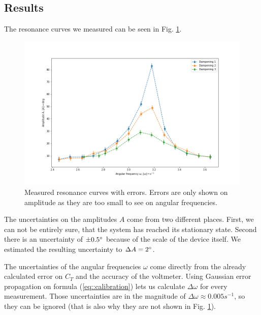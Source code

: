 \subsection{Results}
The resonance curves we measured can be seen in Fig. \ref{fig::resonance}.

\begin{figure} [ht]
	\centering
	\includegraphics[width=350pt]{python/resonance.PNG}
	\caption{Measured resonance curves with errors. Errors are only shown on amplitude as they are too small to see on angular frequencies.}
	\label{fig::resonance}
\end{figure}

The uncertainties on the amplitudes $A$ come from two different places.
First, we can not be entirely sure, that the system has reached its stationary state.
Second there is an uncertainty of $\pm 0.5 \degree$ because of the scale of the device itself.
We estimated the resulting uncertainty to $\Delta A = 2 \degree$.

The uncertainties of the angular frequencies $\omega$ come directly from the already calculated error on $C_T$ and the accuracy of the voltmeter.
Using Gaussian error propagation on formula (\ref{eq::calibration}) lets us calculate $\Delta \omega$ for every measurement. 
Those uncertainties are in the magnitude of $\Delta \omega \approx 0.005 s^{-1}$, so they can be ignored (that is also why they are not shown in Fig. \ref{fig::resonance}).


